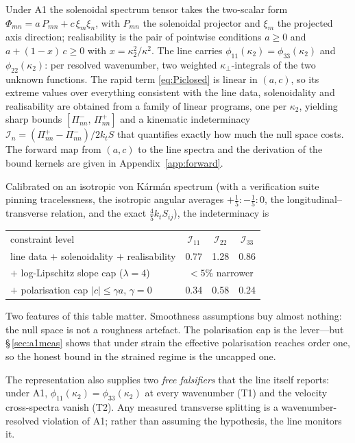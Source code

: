 \documentclass[11pt,a4paper]{article}
\newcounter{assumption}
\begin{document}
Under A1 the solenoidal spectrum tensor takes the two-scalar form
$\Phi_{mn}=a\,P_{mn}+c\,\xi_m\xi_n$, with $P_{mn}$ the solenoidal projector
and $\xi_m$ the projected axis direction; realisability is the pair of
pointwise conditions $a\ge0$ and $a+(1-x)\,c\ge0$ with
$x=\kappa_2^2/\kappa^2$. The line carries $\phi_{11}(\kappa_2)
=\phi_{33}(\kappa_2)$ and $\phi_{22}(\kappa_2)$: per resolved wavenumber,
two weighted $\kappa_\perp$-integrals of the two unknown functions. The
rapid term \eqref{eq:Piclosed} is linear in $(a,c)$, so its extreme values
over everything consistent with the line data, solenoidality and
realisability are obtained from a family of linear programs, one per
$\kappa_2$, yielding sharp bounds
$[\Pi^{-}_{nn},\,\Pi^{+}_{nn}]$ and a kinematic indeterminacy
$\mathcal I_n=(\Pi^{+}_{nn}-\Pi^{-}_{nn})/2k_tS$ that quantifies exactly
how much the null space costs. The forward map from $(a,c)$ to the line
spectra and the derivation of the bound kernels are given in
Appendix~\ref{app:forward}.

Calibrated on an isotropic von K\'arm\'an spectrum (with a verification
suite pinning tracelessness, the isotropic angular averages
$+\tfrac15:-\tfrac15:0$, the longitudinal--transverse relation, and the
exact $\tfrac45 k_t S_{ij}$), the indeterminacy is
\begin{center}\small
\begin{tabular}{lccc}
constraint level & $\mathcal I_{11}$ & $\mathcal I_{22}$ & $\mathcal I_{33}$\\[1pt]
line data $+$ solenoidality $+$ realisability & 0.77 & 1.28 & 0.86\\
$+$ log-Lipschitz slope cap ($\lambda=4$) & \multicolumn{3}{c}{$<5\%$ narrower}\\
$+$ polarisation cap $|c|\le\gamma a$, $\gamma=0$ & 0.34 & 0.58 & 0.24\\
\end{tabular}
\end{center}
Two features of this table matter. Smoothness assumptions buy almost
nothing: the null space is not a roughness artefact. The polarisation cap
is the lever---but \S\,\ref{sec:a1meas} shows that under strain the
effective polarisation reaches order one, so the honest bound in the
strained regime is the uncapped one.

The representation also supplies two \emph{free falsifiers} that the line
itself reports: under A1, $\phi_{11}(\kappa_2)=\phi_{33}(\kappa_2)$ at
every wavenumber (T1) and the velocity cross-spectra vanish (T2). Any
measured transverse splitting is a wavenumber-resolved violation of A1;
rather than assuming the hypothesis, the line monitors it.
\end{document}
